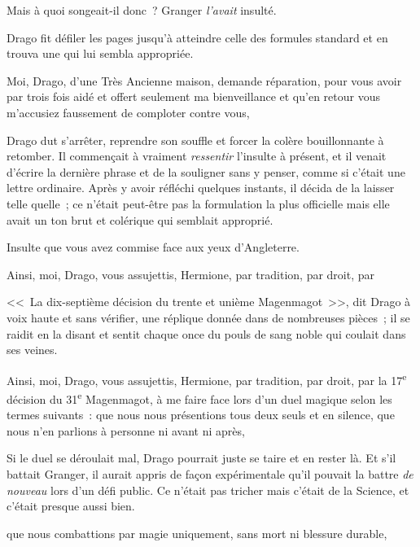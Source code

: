Mais à quoi songeait-il donc~? Granger \emph{l'avait} insulté.

Drago fit défiler les pages jusqu'à atteindre celle des formules standard et en trouva une qui lui sembla appropriée.

\begin{writtenNote}
Moi, Drago, d'une Très Ancienne maison, demande réparation, pour vous avoir par trois fois aidé et offert seulement ma bienveillance et qu'en retour vous m'accusiez {faussement} de comploter contre vous, \end{writtenNote}

Drago dut s'arrêter, reprendre son souffle et forcer la colère bouillonnante à retomber. Il commençait à vraiment \emph{ressentir} l'insulte à présent, et il venait d'écrire la dernière phrase et de la souligner sans y penser, comme si c'était une lettre ordinaire. Après y avoir réfléchi quelques instants, il décida de la laisser telle quelle~; ce n'était peut-être pas la formulation la plus officielle mais elle avait un ton brut et colérique qui semblait approprié.

\begin{writtenNote}
Insulte que vous avez commise face aux yeux d'Angleterre.

Ainsi, moi, Drago, vous assujettis, Hermione, par tradition, par droit, par
\end{writtenNote}

<<~La dix-septième décision du trente et unième Magenmagot~>>, dit Drago à voix haute et sans vérifier, une réplique donnée dans de nombreuses pièces~; il se raidit en la disant et sentit chaque once du pouls de sang noble qui coulait dans ses veines.

\begin{writtenNote}
Ainsi, moi, Drago, vous assujettis, Hermione, par tradition, par droit, par la 17\textsuperscript{e} décision du 31\textsuperscript{e} Magenmagot, à me faire face lors d'un duel magique selon les termes suivants~: que nous nous présentions tous deux seuls et en silence, que nous n'en parlions à personne ni avant ni après,\end{writtenNote}

Si le duel se déroulait mal, Drago pourrait juste se taire et en rester là. Et s'il battait Granger, il aurait appris de façon expérimentale qu'il pouvait la battre \emph{de nouveau} lors d'un défi public. Ce n'était pas tricher mais c'était de la Science, et c'était presque aussi bien.

\begin{writtenNote}
que nous combattions par magie uniquement, sans mort ni blessure durable,
\end{writtenNote}

